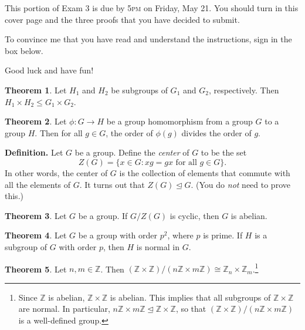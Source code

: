\documentclass[11pt]{article}
\theoremstyle{definition}
\newtheorem{theorem}{Theorem}
\begin{document}
This portion of Exam 3 is due by 5\textsc{pm} on Friday, May 21.  You should turn in this cover page and the three proofs that you have decided to submit.

\bigskip

To convince me that you have read and understand the instructions, sign in the box below.

\bigskip


\bigskip

Good luck and have fun!

\newpage

\begin{theorem}
Let $H_1$ and $H_2$ be subgroups of $G_1$ and $G_2$, respectively.  Then $H_1\times H_2\leq G_1\times G_2$.
\end{theorem}

\newpage

\begin{theorem}
Let $\phi: G\to H$ be a group homomorphism from a group $G$ to a group $H$.  Then for all $g\in G$, the order of $\phi(g)$ divides the order of $g$.
\end{theorem}

\newpage

\textbf{Definition.}  Let $G$ be a group.  Define the \emph{center} of $G$ to be the set
\[
Z(G)=\{x\in G: xg=gx \text{ for all } g\in G\}.
\]
In other words, the center of $G$ is the collection of elements that commute with all the elements of $G$.  It turns out that $Z(G)\trianglelefteq G$.  (You do \emph{not} need to prove this.)

\begin{theorem}
Let $G$ be a group.  If $G/Z(G)$ is cyclic, then $G$ is abelian.
\end{theorem}

\newpage

\begin{theorem}
Let $G$ be a group with order $p^2$, where $p$ is prime.  If $H$ is a subgroup of $G$ with order $p$, then $H$ is normal in $G$.
\end{theorem}

\newpage

\begin{theorem}
Let $n,m \in \mathbb{Z}$.  Then $(\mathbb{Z}\times \mathbb{Z})/(n\mathbb{Z}\times m\mathbb{Z})\cong \mathbb{Z}_n\times \mathbb{Z}_m$.\footnote{Since $\mathbb{Z}$ is abelian, $\mathbb{Z}\times \mathbb{Z}$ is abelian.  This implies that all subgroups of  $\mathbb{Z}\times \mathbb{Z}$ are normal.  In particular, $n\mathbb{Z}\times m\mathbb{Z}\trianglelefteq \mathbb{Z}\times \mathbb{Z}$, so that $(\mathbb{Z}\times \mathbb{Z})/(n\mathbb{Z}\times m\mathbb{Z})$ is a well-defined group.}
\end{theorem}
\end{document}
